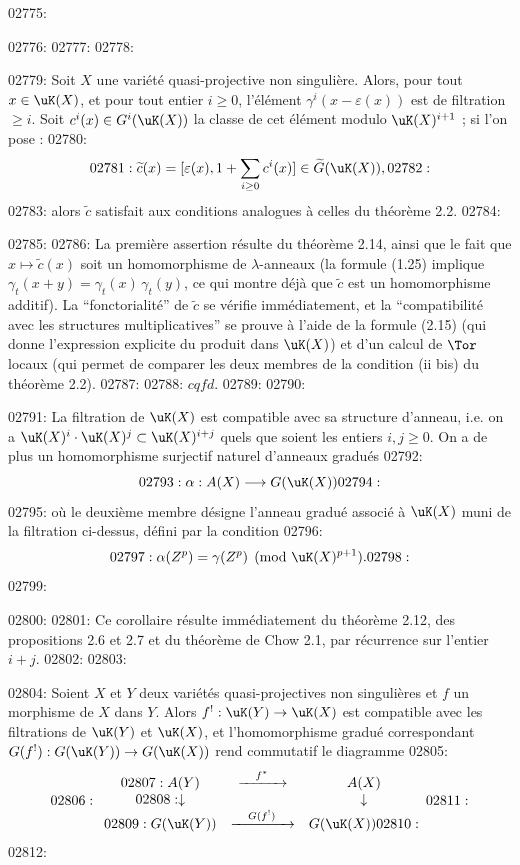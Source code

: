 02775: 
02776: %
02777: 
02778: \begin{theoreme}\label{thm:2.16}
02779: Soit $X$ une vari\'et\'e quasi-projective non singuli\`ere. Alors, pour tout $x \in \uK(X)$, et pour tout entier $i \geq 0$, l'\'el\'ement $\gamma^i(x - \varepsilon(x))$ est de filtration $\geq i$. Soit $c^i(x) \in G^i(\uK(X))$ la classe de cet \'el\'ement modulo $\uK(X)^{i+1}$ ; si l'on pose :
02780: \[
02781: \widetilde{c}(x) = [\varepsilon(x), 1 + \sum_{i \geq 0} c^i(x)] \in \widetilde{G}(\uK(X)),
02782: \]
02783: alors $\widetilde{c}$ satisfait aux conditions analogues \`a celles du th\'eor\`eme 2.2.
02784: \end{theoreme}
02785: 
02786: La premi\`ere assertion r\'esulte du th\'eor\`eme 2.14, ainsi que le fait que $x \mapsto \widetilde{c}(x)$ soit un homomorphisme de $\lambda$-anneaux (la formule (1.25) implique $\gamma_t(x+y) = \gamma_t(x)\,\gamma_t(y)$, ce qui montre d\'ej\`a que $\widetilde{c}$ est un homomorphisme additif). La ``fonctorialit\'e'' de $\widetilde{c}$ se v\'erifie imm\'ediatement, et la ``compatibilit\'e avec les structures multiplicatives'' se prouve \`a l'aide de la formule (2.15) (qui donne l'expression explicite du produit dans $\uK(X)$) et d'un calcul de $\Tor$ locaux (qui permet de comparer les deux membres de la condition (ii bis) du th\'eor\`eme 2.2).
02787: 
02788: \hfill $cqfd.$
02789: 
02790: \begin{corollaire}\label{cor:2.16.1}
02791: La filtration de $\uK(X)$ est compatible avec sa structure d'anneau, i.e. on a $\uK(X)^i \cdot \uK(X)^j \subset \uK(X)^{i+j}$ quels que soient les entiers $i, j \geq 0$. On a de plus un homomorphisme surjectif naturel d'anneaux gradu\'es
02792: \begin{equation}\label{eq:2.34}
02793: \alpha : A(X) \longrightarrow G(\uK(X))
02794: \end{equation}
02795: o\`u le deuxi\`eme membre d\'esigne l'anneau gradu\'e associ\'e \`a $\uK(X)$ muni de la filtration ci-dessus, d\'efini par la condition
02796: \[
02797: \alpha(Z^p) = \gamma(Z^p) \pmod{\uK(X)^{p+1}}.
02798: \]
02799: \end{corollaire}
02800: 
02801: Ce corollaire r\'esulte imm\'ediatement du th\'eor\`eme 2.12, des propositions 2.6 et 2.7 et du th\'eor\`eme de Chow 2.1, par r\'ecurrence sur l'entier $i + j$.
02802: 
02803: \begin{corollaire}\label{cor:2.16.2}
02804: Soient $X$ et $Y$ deux vari\'et\'es quasi-projectives non singuli\`eres et $f$ un morphisme de $X$ dans $Y$. Alors $f^! : \uK(Y) \to \uK(X)$ est compatible avec les filtrations de $\uK(Y)$ et $\uK(X)$, et l'homomorphisme gradu\'e correspondant $G(f^!) : G(\uK(Y)) \to G(\uK(X))$ rend commutatif le diagramme
02805: \[
02806: \begin{array}{ccc}
02807: A(Y) & \xrightarrow{\quad f^*\quad} & A(X) \\
02808: \downarrow & & \downarrow \\
02809: G(\uK(Y)) & \xrightarrow{\quad G(f^!)\quad} & G(\uK(X))
02810: \end{array}
02811: \]
02812: \end{corollaire}
